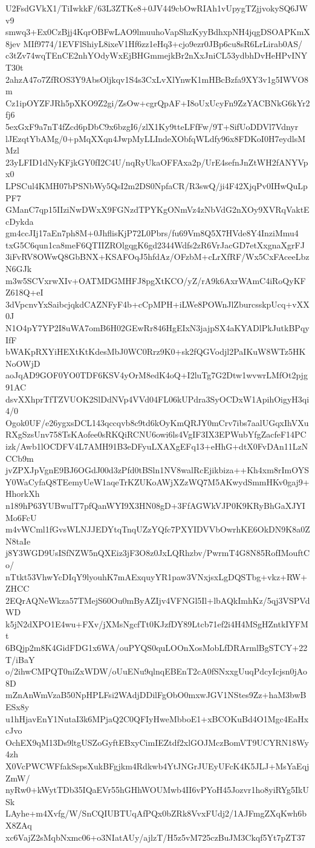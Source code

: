 U2FsdGVkX1/TiIwkkF/63L3ZTKe8+0JV449cbOwRIAh1vUpygTZjjvokySQ6JWv9
smwq3+Ex0CzBjj4KqrOBFwLAO9lmuuhoVapShzKyyBdhxpNH4jqgDSOAPKmX8jev
MIf9774/1EVFlShiyL8ixeV1Hf6zz1eHq3+cjo9ezr0JBp6cu8sR6LrLirab0AS/
c3tZv74wqTEnCE2nhYOdyWxEjBHGmmejkBr2nXxJniCL53ydbhDvHeHPvINYT30t
2ahzA47o7ZfROS3Y9AbsOljkqv1S4s3CxLvXlYnwK1mHBcBzfa9XY3v1g5IWVO8m
Cz1ipOYZFJRh5pXKO9Z2gi/ZsOw+cgrQpAF+I8oUxUcyFn9ZzYACBNkG6kYr2fj6
5exGxF9a7nT4fZcd6pDbC9x6bzgI6/zlX1Ky9tteLFfFw/9T+SifUoDDVl7Vdnyr
lJEzqtYbAMg/0+pMqXXqn4JwpMyLLIndeXObfqWLdfy96x8FDKoI0H7eydlsMMzl
23yLFID1dNyKFjkGY0fI2C4U/nqRyUkaOFFAxa2p/UrE4sefnJnZtWH2fANYVpx0
LPSCul4KMH07bPSNbWy5QsI2m2DS0NpfaCR/R3swQ/ji4F42XjqPv0IHwQuLpPF7
GManC7qp15IIziNwDWxX9FGNzdTPYKgONmVz4zNbVdG2nXOy9XVRqVaktEcDykda
gm4ccJIj17aEn7ph8M+0JhflisKjP72L0Pbrs/fu69Vm8Q5X7HVde8Y4InziMmu4
txG5C6qun1ca8meF6QTIIZROlgqgK6gd2344Wdfs2zR6VrJacGD7etXxgnaXgrFJ
3iFvRV8OWwQ8GbBNX+KSAFOqJ5hfdAz/OFzbM+cLrXfRF/Wx5CxFAceeLbzN6GJk
m3w5SCVxrwXIv+OATMDGMHFJ8pgXtKCO/yZ/rA9k6AxrWAmC4iRoQyKFZ618Q+eI
3dVpcnvYxSaibcjqkdCAZNFyF4b+cCpMPH+iLWe8POWnJlZburcsskpUcq+vXX0J
N1O4pY7YP2I8uWA7omB6H02GEwRr846HgEIxN3jajpSX4aKYADlPkJutkBPqyIfF
bWAKpRXYiHEXtKtKdesMbJ0WC0Rrz9K0+sk2fQGVodjl2PaIKuW8WTz5HKNoOWjD
aoJqAD9GOF0YO0TDF6KSV4yOrM8edK4oQ+I2luTg7G2Dtw1wvwrLMfOt2pjg91AC
dsvXXhprTfTZVUOK2SlDdNVp4VVd04FL06kUPdra3SyOCDxW1ApihOigyH3qi4/0
Ogok0UF/e26ygxsDCL143qccqvb8c9td6kOyKmQRJY0mCrv7ibs7aalUGqxIhVXu
RXgSzsUnv758TsKAofee0sRKQiRCNU6owi6ls4VgIF3IX3EPWubYfgZacfeF14PC
izk/Awb1lOCDFV4L7AMH91B3eDFyuLXAXgEFq13+eHhG+dtX0FvDAn11LzNCCb9m
jvZPXJpVgnE9BJ6OGdJ00d3zPfd0tBSln1NV8walRcEjikbiza++Kh4xm8rImOYS
Y0WaCyfaQ8TEemyUeW1aqeTrKZUKoAWjXZzWQ7M5AKwydSmmHKv0gaj9+HhorkXh
n189hP63YUBwulT7pfQanWYI9X3HN08gD+3FfAGWkVJP0K9KRyBhGaXJYIMo6FcU
m4vWCml1fGvsWLNJJEDYtqTnqUZzYQfc7PXYIDVVbOwrhKE6OkDN9K8a0ZN8taIe
j8Y3WGD9UsISfNZW5nQXEiz3jF3O8z0JxLQRhzbv/PwrmT4G8N85RofIMouftCo/
nTtkt53VhwYcDIqY9lyouhK7mAExquyYR1paw3VNxjsxLgDQSTbg+vkz+RW+ZHCC
2EQrAQNeWkza57TMejS60Ou0mByAZIjv4VFNGl5Il+lbAQkImhKz/5qj3VSPVdWD
k5jN2dXPO1E4wu+FXv/jXMsNgcfTt0KJzfDY89Ltcb71ef2i4H4MSgHZntkIYFMt
6BQjp2m8K4GidFDG1x6WA/ouPYQS0quLOOnXosMobLfDRArmlBgSTCY+22T/iBaY
o/2ihwCMPQT0niZxWDW/oUuENu9qlnqEBEnT2cA0fSNxxgUuqPdcyIcjsn0jAo8D
mZnAnWmVzaB50NpHPLFsi2WAdjDDilFgObO0mxwJGV1NStes9Zz+haM3bwBESx8y
u1hHjavEnY1NutaI3k6MPjaQ2C0QFIyHweMbboE1+xBCOKuBd4O1Mgc4EaHxcJvo
OchEX9qM13Ds9ltgUSZoGyftEBxyCimIEZtdf2xlGOJMczBomVT9UCYRN18Wy4zh
X0VcPWCWFfakSspsXukBFgjkm4Rdkwb4YtJNGrJUEyUFcK4K5JLJ+MsYaEqjZmW/
nyRw0+kWytTDb35IQaEVr55hGHhWOUMwb4II6vPYoH45Jozvr1ho8yiRYg5IkUSk
LAyhe+m4Xvfg/W/SnCQIUBTUqAfPQx0bZRk8VvxFUdj2/1AJFmgZXqKwh6bX8ZAq
xc6VajZ2sMqbNxmc06+o3NIatAUy/ajlzT/H5z5vM725czBuJM3Ckqf5Yt7pZT37
